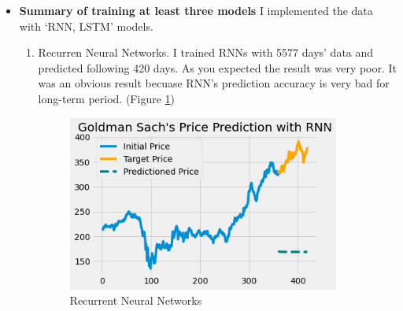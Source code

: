 \documentclass[12pt]{article}
\begin{document}
\begin{itemize}
\item \textbf{Summary of training at least three models} I implemented the data with `RNN, LSTM' models.
    \begin{enumerate}
      \item Recurren Neural Networks. I trained RNNs with 5577 days' data and predicted following 420 days. As you expected the result was very poor. It was an obvious result becuase RNN's prediction accuracy is very bad for long-term period. (Figure \ref{rnn})
      \begin{figure}[H]
        \centering
        \includegraphics[width=0.9\textwidth]{figures/rnn.png}
        \caption{Recurrent Neural Networks}\label{rnn}
      \end{figure}


\end{enumerate}
\end{itemize}
\end{document}
